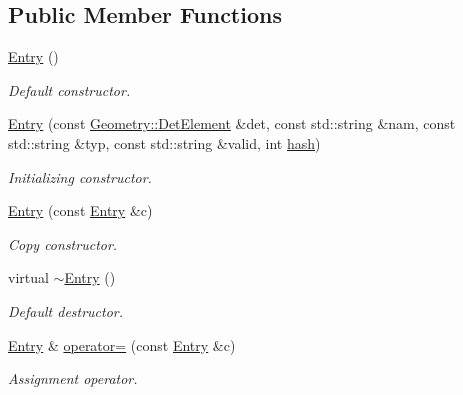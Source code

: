 \subsection*{Public Member Functions}
\begin{DoxyCompactItemize}
\item 
\hyperlink{class_d_d4hep_1_1_conditions_1_1_entry_a31e26e63b90fd0bb0d2772e5614f8afd}{Entry} ()
\begin{DoxyCompactList}\small\item\em Default constructor. \item\end{DoxyCompactList}\item 
\hyperlink{class_d_d4hep_1_1_conditions_1_1_entry_ae825ef5d2bb9cbde929430f57005062a}{Entry} (const \hyperlink{class_d_d4hep_1_1_geometry_1_1_det_element}{Geometry::DetElement} \&det, const std::string \&nam, const std::string \&typ, const std::string \&valid, int \hyperlink{class_d_d4hep_1_1_conditions_1_1_entry_a7f213cb001c089b5aa3ed890aa1f05b5}{hash})
\begin{DoxyCompactList}\small\item\em Initializing constructor. \item\end{DoxyCompactList}\item 
\hyperlink{class_d_d4hep_1_1_conditions_1_1_entry_ae50bfee4f9aea43616b374050530cd57}{Entry} (const \hyperlink{class_d_d4hep_1_1_conditions_1_1_entry}{Entry} \&c)
\begin{DoxyCompactList}\small\item\em Copy constructor. \item\end{DoxyCompactList}\item 
virtual \hyperlink{class_d_d4hep_1_1_conditions_1_1_entry_ace080276d727881acfee7197b85f0b65}{$\sim$Entry} ()
\begin{DoxyCompactList}\small\item\em Default destructor. \item\end{DoxyCompactList}\item 
\hyperlink{class_d_d4hep_1_1_conditions_1_1_entry}{Entry} \& \hyperlink{class_d_d4hep_1_1_conditions_1_1_entry_a750c6f836c0cb9a0bb6975a8f1e9ee01}{operator=} (const \hyperlink{class_d_d4hep_1_1_conditions_1_1_entry}{Entry} \&c)
\begin{DoxyCompactList}\small\item\em Assignment operator. \item\end{DoxyCompactList}\end{DoxyCompactItemize}
